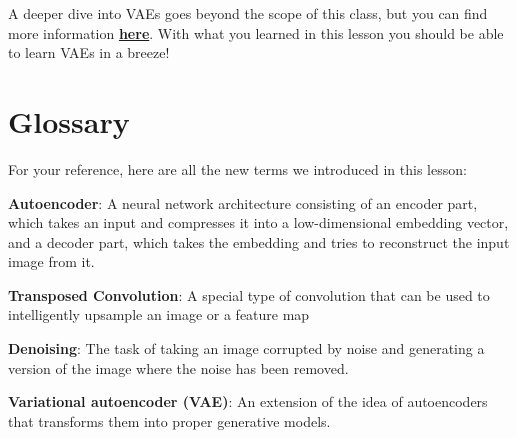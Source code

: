 A deeper dive into VAEs goes beyond the scope of this class, but you can find more information \href{https://towardsdatascience.com/variational-autoencoder-demystified-with-pytorch-implementation-3a06bee395ed}{\textbf{here}}. With what you learned in this lesson you should be able to learn VAEs in a breeze!

\section{Glossary}

For your reference, here are all the new terms we introduced in this lesson:

\textbf{Autoencoder}: A neural network architecture consisting of an encoder part, which takes an input and compresses it into a low-dimensional embedding vector, and a decoder part, which takes the embedding and tries to reconstruct the input image from it.

\textbf{Transposed Convolution}: A special type of convolution that can be used to intelligently upsample an image or a feature map

\textbf{Denoising}: The task of taking an image corrupted by noise and generating a version of the image where the noise has been removed.

\textbf{Variational autoencoder (VAE)}: An extension of the idea of autoencoders that transforms them into proper generative models.